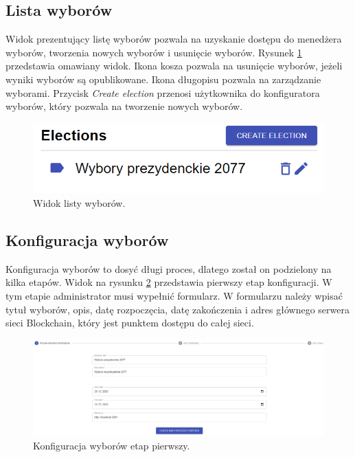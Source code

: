 \documentclass[a4paper,12pt]{book}
\begin{document}
\subsection{Lista wyborów}

Widok prezentujący listę wyborów pozwala na uzyskanie dostępu do menedżera wyborów, tworzenia nowych wyborów i usunięcie wyborów. Rysunek \ref{electionlist} przedstawia omawiany widok. Ikona kosza pozwala na usunięcie wyborów, jeżeli wyniki wyborów są opublikowane. Ikona długopisu pozwala na zarządzanie wyborami. Przycisk \textit{Create election} przenosi użytkownika do konfiguratora wyborów, który pozwala na tworzenie nowych wyborów.

\begin{figure}[h]
	\centering
	\includegraphics[width=\textwidth]{images/electionlist.png}
	\caption{Widok listy wyborów.}\label{electionlist}
\end {figure}

\subsection{Konfiguracja wyborów}

Konfiguracja wyborów to dosyć długi proces, dlatego został on podzielony na kilka etapów. Widok na rysunku \ref{votesconfig1} przedstawia pierwszy etap konfiguracji. W tym etapie administrator musi wypełnić formularz. W formularzu należy wpisać tytuł wyborów, opis, datę rozpoczęcia, datę zakończenia i adres głównego serwera sieci Blockchain, który jest punktem dostępu do całej sieci.

\begin{figure}[h]
	\centering
	\includegraphics[width=\textwidth]{images/votesconfig1.png}
	\caption{Konfiguracja wyborów etap pierwszy.}\label{votesconfig1}
\end {figure}
\end{document}
